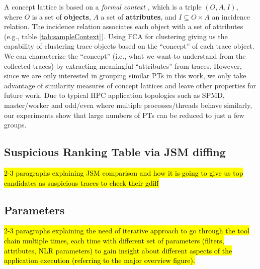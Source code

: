 A concept lattice is based on a \textit{formal context} \cite{clbook}, which is a triple $(O, A, I)$, where $O$ is a set of \textbf{objects}, $A$ a set of \textbf{attributes}, and $I \subseteq O \times A$ an incidence relation. The incidence relation associates each object with a set of attributes (e.g., table \ref{tab:sampleContext}).
%
Using FCA for clustering giving us the capability of clustering trace objects based on the ``concept'' of each trace object. We can characterize the ``concept'' (i.e., what we want to understand from the collected traces) by extracting meaningful ``attributes'' from traces. 
%
However, since we are only interested in grouping similar PTs in this work, we only take advantage of similarity measures \cite{Alqadah2011} of concept lattices and leave other properties for future work.
%
Due to typical HPC application topologies such as SPMD, master/worker and odd/even where multiple processes/threads behave similarly, our experiments show that large numbers of PTs can be reduced to just a few groups.
%




\subsection{Suspicious Ranking Table via JSM diffing}

\hl{2-3 paragraphs explaining JSM comparison and how it is going to give us top candidates as suspicious traces to check their gdiff}
\subsection{Parameters}

\hl{2-3 paragraphs explaining the need of iterative approach to go through the tool chain multiple times, each time with different set of parameters (filters, attributes, NLR parameters) to gain insight about different aspects of the application execution (referring to the major overview figure).}